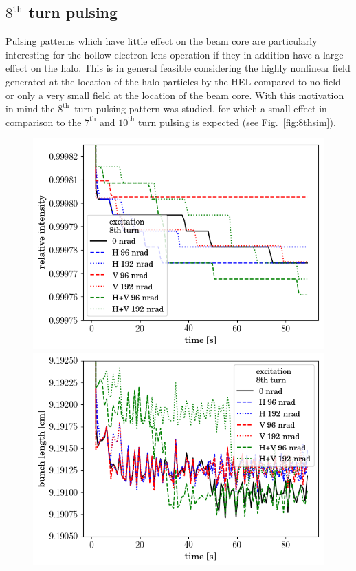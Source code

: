 \documentclass[%
 reprint,
 amsmath,amssymb,
 aps,
prstab,
longbibliography
]{revtex4-1}
\begin{document}
\subsection{$8^{\mathrm{th}}$ turn pulsing\label{sec:simex8}}
Pulsing patterns which have little effect on the beam core are particularly interesting for the hollow electron lens operation if they in addition have a large effect on the halo. This is in general feasible considering the highly nonlinear field generated at the location of the halo particles by the HEL compared to no field or only a very small field at the location of the beam core. With this motivation in mind the $8^{\mathrm{th}}$~turn pulsing pattern was studied, for which a small effect in comparison to the $7^{\mathrm{th}}$ and $10^{\mathrm{th}}$ turn pulsing is expected (see Fig.~\ref{fig:8thsim}).
\begin{figure}[h]
	\begin{minipage}[t]{0.49\linewidth}
		\centering
		\includegraphics[width=1.0\linewidth]{2017injerra2b2uran1_2e-3_8th_3_5um_intensity.png}
	\end{minipage}
	\begin{minipage}[t]{0.49\linewidth}
		\centering
		\includegraphics[width=1.0\linewidth]{2017injerra2b2uran1_2e-3_8th_3_5um_sigm.png}

\end{minipage}
\end{figure}
\end{document}
